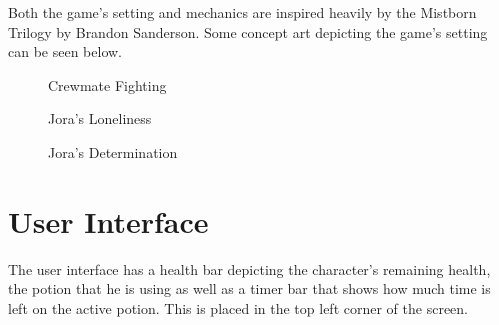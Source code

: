 \documentclass{article}
\begin{document}
Both the game's setting and mechanics are inspired heavily by the Mistborn Trilogy by Brandon Sanderson. Some concept art depicting the game's setting can be seen below.

\begin{figure}[!htb]
  \caption {Crewmate Fighting}
  \end{figure}

  \begin{figure}[!htb]
  \caption {Jora's Loneliness}
  \end{figure}

  \begin{figure}[!htb]
  \caption {Jora's Determination}
  \end{figure}

\section{User Interface}

The user interface has a health bar depicting the character's remaining health, the potion that he is using as well as a timer bar that shows how much time is left on the active potion. This is placed in the top left corner of the screen.\\
\end{document}
